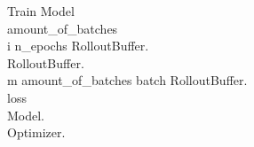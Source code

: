 \renewcommand{\thepseudonum}{\roman{pseudonum}}
\begin{pseudocode}{Train Model}{ }
    \\

    amount\_of\_batches \GETS {}\\
    \FOR i  \TO n\_epochs \DO
    \BEGIN
    RolloutBuffer.\\
    RolloutBuffer.\\
    \FOR m  \TO amount\_of\_batches \DO
    \BEGIN
    batch \GETS RolloutBuffer.\\
    loss \GETS {}\\
    Model.\\
    Optimizer.\\
    \END\\
    \END
    \ENDPROCEDURE
    \label{pseudocode:train_model}
\end{pseudocode}


